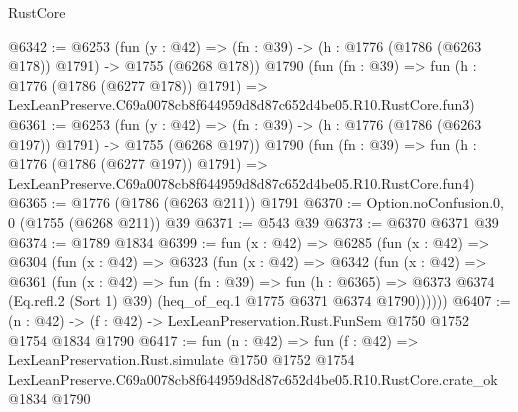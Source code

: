 \begin{lexlean}{RustCore}
\begin{coremodule}
@6342 := @6253
    (fun (y : @42) => (fn : @39) -> (h : @1776 (@1786 (@6263 @178)) @1791) -> @1755 (@6268 @178))
    @1790
    (fun (fn : @39) =>
    fun (h : @1776 (@1786 (@6277 @178)) @1791) =>
    LexLeanPreserve.C69a0078cb8f644959d8d87c652d4be05.R10.RustCore.fun3)
@6361 := @6253
    (fun (y : @42) => (fn : @39) -> (h : @1776 (@1786 (@6263 @197)) @1791) -> @1755 (@6268 @197))
    @1790
    (fun (fn : @39) =>
    fun (h : @1776 (@1786 (@6277 @197)) @1791) =>
    LexLeanPreserve.C69a0078cb8f644959d8d87c652d4be05.R10.RustCore.fun4)
@6365 := @1776 (@1786 (@6263 @211)) @1791
@6370 := Option.noConfusion.{0, 0} (@1755 (@6268 @211)) @39
@6371 := @543 @39
@6373 := @6370 @6371 @39
@6374 := @1789 @1834
@6399 := fun (x : @42) =>
  @6285
    (fun (x : @42) =>
    @6304
      (fun (x : @42) =>
      @6323
        (fun (x : @42) =>
        @6342
          (fun (x : @42) =>
          @6361
            (fun (x : @42) =>
            fun (fn : @39) =>
            fun (h : @6365) =>
            @6373 @6374 (Eq.refl.{2} (Sort 1) @39) (heq_of_eq.{1} @1775 @6371 @6374 @1790))))))
@6407 := (n : @42) -> (f : @42) -> LexLeanPreservation.Rust.FunSem @1750 @1752 @1754 @1834 @1790
@6417 := fun (n : @42) =>
  fun (f : @42) =>
  LexLeanPreservation.Rust.simulate
    @1750
    @1752
    @1754
    LexLeanPreserve.C69a0078cb8f644959d8d87c652d4be05.R10.RustCore.crate_ok
    @1834
    @1790
\end{coremodule}
\end{lexlean}
